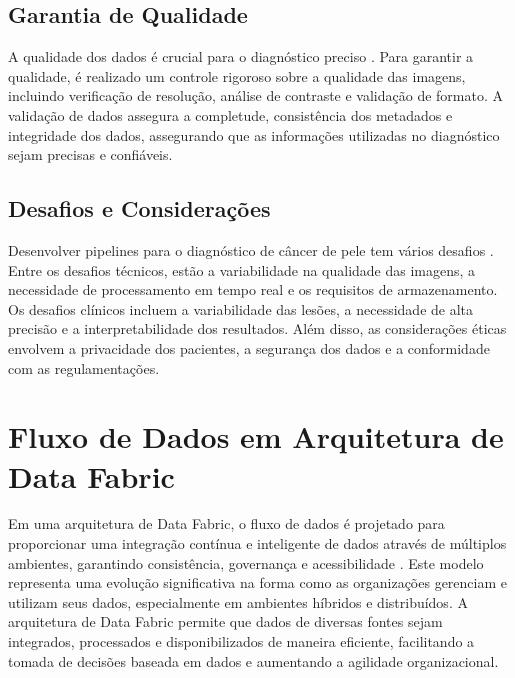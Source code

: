 \subsection{Garantia de Qualidade}
A qualidade dos dados é crucial para o diagnóstico preciso \cite{smith2023quality}. Para garantir a qualidade, é realizado um controle rigoroso sobre a qualidade das imagens, incluindo verificação de resolução, análise de contraste e validação de formato. A validação de dados assegura a completude, consistência dos metadados e integridade dos dados, assegurando que as informações utilizadas no diagnóstico sejam precisas e confiáveis.
\subsection{Desafios e Considerações}
Desenvolver pipelines para o diagnóstico de câncer de pele tem vários desafios \cite{chen2023challenges}. Entre os desafios técnicos, estão a variabilidade na qualidade das imagens, a necessidade de processamento em tempo real e os requisitos de armazenamento. Os desafios clínicos incluem a variabilidade das lesões, a necessidade de alta precisão e a interpretabilidade dos resultados. Além disso, as considerações éticas envolvem a privacidade dos pacientes, a segurança dos dados e a conformidade com as regulamentações.



\section{Fluxo de Dados em Arquitetura de Data Fabric}
Em uma arquitetura de Data Fabric, o fluxo de dados é projetado para proporcionar uma integração contínua e inteligente de dados através de múltiplos ambientes, garantindo consistência, governança e acessibilidade \cite{sharma2023data}. Este modelo representa uma evolução significativa na forma como as organizações gerenciam e utilizam seus dados, especialmente em ambientes híbridos e distribuídos. A arquitetura de Data Fabric permite que dados de diversas fontes sejam integrados, processados e disponibilizados de maneira eficiente, facilitando a tomada de decisões baseada em dados e aumentando a agilidade organizacional.
